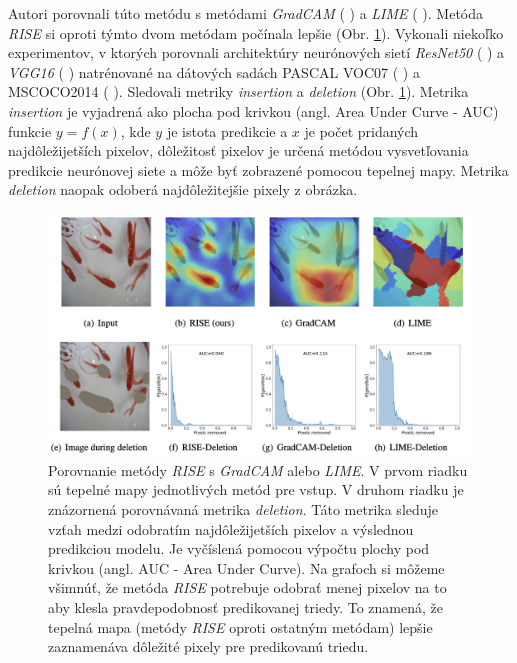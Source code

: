 Autori porovnali túto metódu s metódami \textit{GradCAM} (\citeauthor*{selvaraju2017grad} \citeyear{selvaraju2017grad}) a \textit{LIME} (\citeauthor*{ribeiro2016should} \citeyear{ribeiro2016should}). Metóda \textit{RISE} si oproti týmto dvom metódam počínala lepšie (Obr. \ref{fig:rise_results}). Vykonali niekoľko experimentov, v ktorých porovnali architektúry neurónových sietí \textit{ResNet50} (\citeauthor*{he2016deep} \citeyear{he2016deep}) a \textit{VGG16} (\citeauthor{simonyan2014very} \citeyear{simonyan2014very}) natrénované na dátových sadách PASCAL VOC07 (\citeauthor*{everingham2010pascal} \citeyear{he2016deep}) a MSCOCO2014 (\citeauthor*{lin2014microsoft} \citeyear{lin2014microsoft}). Sledovali metriky \textit{insertion} a \textit{deletion} (Obr. \ref{fig:rise_results}). Metrika \textit{insertion} je vyjadrená ako plocha pod krivkou (angl. Area Under Curve - AUC) funkcie $y = f(x)$, kde $y$ je istota predikcie a $x$ je počet pridaných najdôležijetších pixelov, dôležitosť pixelov je určená metódou vysvetľovania predikcie neurónovej siete a môže byť zobrazené pomocou tepelnej mapy. Metrika \textit{deletion} naopak odoberá najdôležitejšie pixely z obrázka.

\begin{figure}[h!]
\centering
\includegraphics[scale=0.5]{assets/images/rise_results.png}
\caption{Porovnanie metódy \textit{RISE} s \textit{GradCAM} alebo \textit{LIME}. \cite{petsiuk2018rise} V prvom riadku sú tepelné mapy jednotlivých metód pre vstup. V druhom riadku je znázornená porovnávaná metrika \textit{deletion}. Táto metrika sleduje vzťah medzi odobratím najdôležijetších pixelov a výslednou predikciou modelu. Je vyčíslená pomocou výpočtu plochy pod krivkou (angl. AUC - Area Under Curve). Na grafoch si môžeme všimnúť, že metóda \textit{RISE} potrebuje odobrať menej pixelov na to aby klesla pravdepodobnosť predikovanej triedy. To znamená, že tepelná mapa (metódy \textit{RISE} oproti ostatným metódam) lepšie zaznamenáva dôležité pixely pre predikovanú triedu.}
\label{fig:rise_results}
\end{figure}

